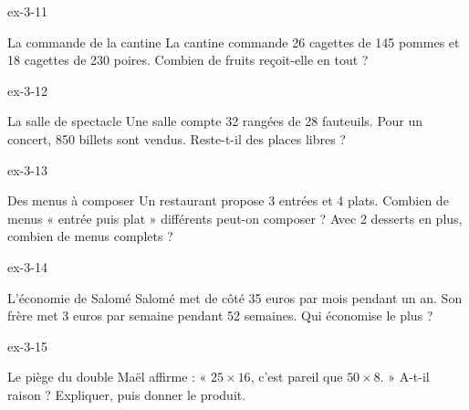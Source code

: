 \begin{blocLivre}{ex-3-11}\begin{exercice}[3]{La commande de la cantine}
La cantine commande 26 cagettes de 145 pommes et 18 cagettes de 230 poires. Combien de fruits reçoit-elle en tout ?
\end{exercice}\end{blocLivre}
\begin{blocLivre}{ex-3-12}\begin{exercice}[3]{La salle de spectacle}
Une salle compte 32 rangées de 28 fauteuils. Pour un concert, 850 billets sont vendus. Reste-t-il des places libres ?
\end{exercice}\end{blocLivre}
\begin{blocLivre}{ex-3-13}\begin{exercice}[3]{Des menus à composer}
Un restaurant propose 3 entrées et 4 plats. Combien de menus « entrée puis plat » différents peut-on composer ? Avec 2 desserts en plus, combien de menus complets ?
\end{exercice}\end{blocLivre}
\begin{blocLivre}{ex-3-14}\begin{exercice}[3]{L’économie de Salomé}
Salomé met de côté 35 euros par mois pendant un an. Son frère met 3 euros par semaine pendant 52 semaines. Qui économise le plus ?
\end{exercice}\end{blocLivre}
\begin{blocLivre}{ex-3-15}\begin{exercice}[3]{Le piège du double}
Maël affirme : « $25\times16$, c’est pareil que $50\times8$. » A-t-il raison ? Expliquer, puis donner le produit.
\end{exercice}\end{blocLivre}

\clearpage

